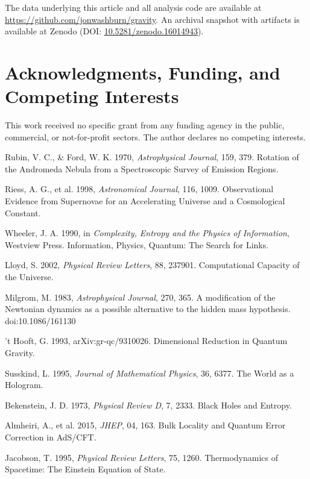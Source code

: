 \documentclass[usenatbib]{mnras}
\begin{document}
The data underlying this article and all analysis code are available at \href{https://github.com/jonwashburn/gravity}{https://github.com/jonwashburn/gravity}. An archival snapshot with artifacts is available at Zenodo (DOI: \href{https://doi.org/10.5281/zenodo.16014943}{10.5281/zenodo.16014943}).

\section*{Acknowledgments, Funding, and Competing Interests}

This work received no specific grant from any funding agency in the public, commercial, or not-for-profit sectors. The author declares no competing interests.

\begin{thebibliography}{99}
 Rubin, V. C., \& Ford, W. K. 1970, \textit{Astrophysical Journal}, 159, 379. Rotation of the Andromeda Nebula from a Spectroscopic Survey of Emission Regions.

 Riess, A. G., et al. 1998, \textit{Astronomical Journal}, 116, 1009. Observational Evidence from Supernovae for an Accelerating Universe and a Cosmological Constant.

 Wheeler, J. A. 1990, in \textit{Complexity, Entropy and the Physics of Information}, Westview Press. Information, Physics, Quantum: The Search for Links.

 Lloyd, S. 2002, \textit{Physical Review Letters}, 88, 237901. Computational Capacity of the Universe.

 Milgrom, M. 1983, \textit{Astrophysical Journal}, 270, 365. A modification of the Newtonian dynamics as a possible alternative to the hidden mass hypothesis. doi:10.1086/161130

 't Hooft, G. 1993, arXiv:gr-qc/9310026. Dimensional Reduction in Quantum Gravity.

 Susskind, L. 1995, \textit{Journal of Mathematical Physics}, 36, 6377. The World as a Hologram.

 Bekenstein, J. D. 1973, \textit{Physical Review D}, 7, 2333. Black Holes and Entropy.

 Almheiri, A., et al. 2015, \textit{JHEP}, 04, 163. Bulk Locality and Quantum Error Correction in AdS/CFT.

 Jacobson, T. 1995, \textit{Physical Review Letters}, 75, 1260. Thermodynamics of Spacetime: The Einstein Equation of State.


\end{thebibliography}
\end{document}
